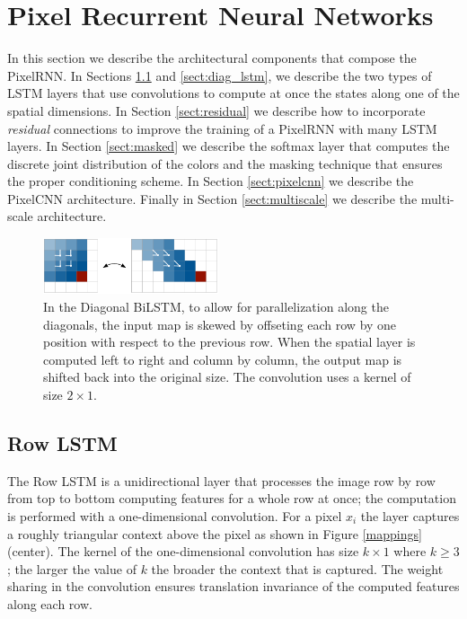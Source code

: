 \section{Pixel Recurrent Neural Networks}
\label{sect:pixelrnn}

In this section we describe the architectural components that compose the {PixelRNN}. In Sections \ref{sect:row_lstm} and \ref{sect:diag_lstm}, we describe the two types of LSTM layers that use convolutions to compute at once the states along one of the spatial dimensions. 
In Section \ref{sect:residual} we describe how to incorporate \emph{residual} connections to improve the training of a PixelRNN with many LSTM layers.  In Section \ref{sect:masked} we describe the softmax layer that computes the {discrete} joint distribution of the colors and the masking technique that ensures the proper conditioning scheme. In Section \ref{sect:pixelcnn} we describe the PixelCNN architecture. Finally in Section \ref{sect:multiscale} we describe the multi-scale architecture.

\begin{figure}
\centering
\includegraphics[width=0.46\textwidth]{bilstm.pdf}
\vspace{-0.3cm}
\caption{In the Diagonal BiLSTM, to allow for parallelization along the diagonals, the input map is skewed by offseting each row by one position with respect to the previous row. When the spatial layer is computed left to right and column by column, the output map is shifted back into the original size. The convolution uses a kernel of size $2 \times 1$. }
\label{fig:bilstm}
\vspace{-0.3cm}
\end{figure}

\subsection{Row LSTM}
\label{sect:row_lstm}

The Row LSTM is a unidirectional layer that processes the image row by row from top to bottom computing features for a whole row at once; the computation is performed with a one-dimensional convolution. For a pixel $x_i$ the layer captures a roughly triangular context above the pixel as shown in Figure \ref{mappings} (center). The kernel of the one-dimensional convolution has size $k \times 1$ where $k \geq 3$; the larger the value of $k$ the broader the context that is captured. The weight sharing in the convolution ensures translation invariance of the computed features along each row.

